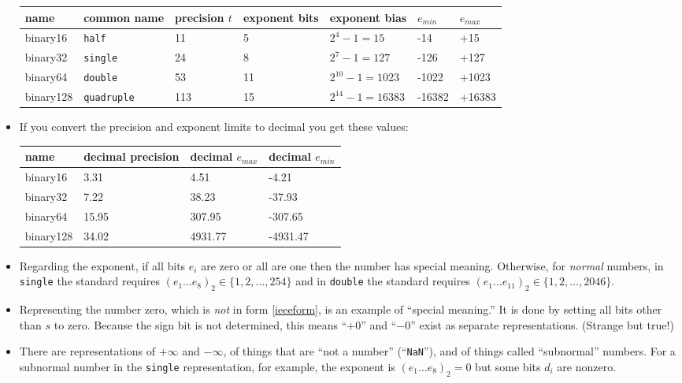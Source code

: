 \documentclass[11pt]{amsart}
\begin{document}
\begin{itemize}
\bigskip
\small
\begin{tabular}{lllllll}
name     & common name & precision $t$ & exponent bits & exponent bias & $e_{min}$ & $e_{max}$ \\ \hline
binary16 &      \texttt{half} & 11 &  5 &      $2^4-1=15$ &   -14 &   +15 \\
binary32 &    \texttt{single} & 24 &  8 &     $2^7-1=127$ &  -126 &  +127 \\
binary64 &    \texttt{double} & 53 & 11 & $2^{10}-1=1023$ & -1022 & +1023 \\
binary128 &\texttt{quadruple} &113 & 15 &$2^{14}-1=16383$ &-16382 &+16383
\end{tabular}
\normalsize
\medskip

\item If you convert the precision and exponent limits to decimal you get these values:

\bigskip
\small
\begin{tabular}{llll}
name & decimal precision & decimal $e_{max}$ & decimal $e_{min}$ \\ \hline
binary16 & 3.31 & 4.51 & -4.21 \\
binary32 & 7.22 & 38.23 & -37.93 \\
binary64 & 15.95 & 307.95 & -307.65 \\
binary128 & 34.02 & 4931.77 & -4931.47
\end{tabular}
\normalsize
\medskip

\item Regarding the exponent, if all bits $e_i$ are zero or all are one then the number has special meaning.  Otherwise, for \emph{normal} numbers, in \texttt{single} the standard requires $\left(e_1\dots e_8\right)_2 \in \{1,2,\dots,254\}$ and in \texttt{double} the standard requires $\left(e_1\dots e_{11}\right)_2 \in \{1,2,\dots,2046\}$.

\item Representing the number zero, which  is \emph{not} in form \eqref{ieeeform}, is an example of ``special meaning.''  It is done by setting all bits other than $s$ to zero.  Because the sign bit is not determined, this means ``$+0$'' and ``$-0$'' exist as separate representations.  (Strange but true!)

\item There are representations of $+\infty$ and $-\infty$, of things that are ``not a number'' (``\texttt{NaN}''), and of things called ``subnormal'' numbers.  For a subnormal number in the \texttt{single} representation, for example, the exponent is $\left(e_1\dots e_8\right)_2 = 0$ but some bits $d_i$ are nonzero.


\end{itemize}
\end{document}
